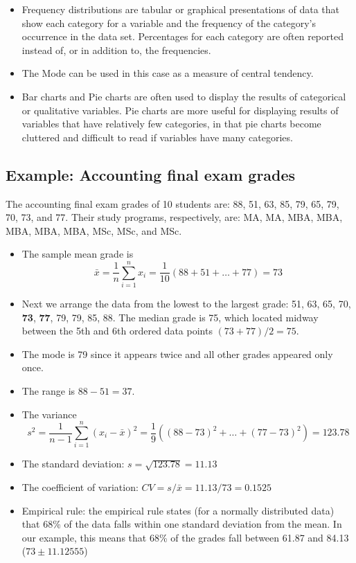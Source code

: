 \documentclass[
]{article}
\begin{document}
\begin{itemize}
\item
  Frequency distributions are tabular or graphical presentations of data
  that show each category for a variable and the frequency of the
  category's occurrence in the data set. Percentages for each category
  are often reported instead of, or in addition to, the frequencies.
\item
  The Mode can be used in this case as a measure of central tendency.
\item
  Bar charts and Pie charts are often used to display the results of
  categorical or qualitative variables. Pie charts are more useful for
  displaying results of variables that have relatively few categories,
  in that pie charts become cluttered and difficult to read if variables
  have many categories.
\end{itemize}

\hypertarget{example-accounting-final-exam-grades}{%
\subsection{Example: Accounting final exam
grades}\label{example-accounting-final-exam-grades}}

The accounting final exam grades of 10 students are: 88, 51, 63, 85, 79,
65, 79, 70, 73, and 77. Their study programs, respectively, are: MA, MA,
MBA, MBA, MBA, MBA, MBA, MSc, MSc, and MSc.

\begin{itemize}
\item
  The sample mean grade is
  \[\bar{x}=\frac{1}{n}\sum_{i=1}^{n}x_i=\frac{1}{10}(88+51+\ldots+77)=73\]
\item
  Next we arrange the data from the lowest to the largest grade: 51, 63,
  65, 70, \textbf{73}, \textbf{77}, 79, 79, 85, 88. The median grade is
  75, which located midway between the 5th and 6th ordered data points
  \((73+77)/2=75\).
\item
  The mode is 79 since it appears twice and all other grades appeared
  only once.
\item
  The range is \(88-51=37\).
\item
  The variance
  \[s^2=\frac{1}{n-1}\sum_{i=1}^{n}(x_i-\bar{x})^2=\frac{1}{9}((88-73)^2+\ldots+(77-73)^2)=123.78\]
\item
  The standard deviation: \(s=\sqrt{123.78}=11.13\)
\item
  The coefficient of variation: \(CV=s/\bar{x}=11.13/73=0.1525\)
\item
  Empirical rule: the empirical rule states (for a normally distributed
  data) that 68\% of the data falls within one standard deviation from
  the mean. In our example, this means that 68\% of the grades fall
  between 61.87 and 84.13 (\(73\pm 11.12555\))
\end{itemize}
\end{document}
